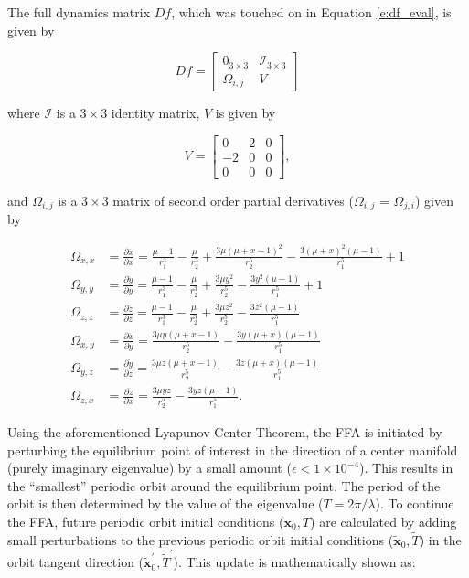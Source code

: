 \documentclass[11pt]{article} %
\begin{document}
\noindent
The full dynamics matrix $Df$, which was touched on in Equation \ref{e:df_eval}, is given by

\doublespace
\begin{equation}
	\label{e:df_full}
	Df = \begin{bmatrix}
		0_{3\times3} & \mathcal{I}_{3\times3} \\
		\Omega_{i,j} & V
	\end{bmatrix}
\end{equation}
\singlespace

\noindent
where $\mathcal{I}$ is a $3\times3$ identity matrix, $V$ is given by

\begin{equation}
	V = \begin{bmatrix}
		0 & 2 & 0 \\
		-2 & 0 & 0 \\
		0 & 0 & 0
	\end{bmatrix},
\end{equation}

\noindent
and $\Omega_{i,j}$ is a $3\times3$ matrix of second order partial derivatives ($\Omega_{i,j}$ = $\Omega_{j,i}$) given by

\begin{align}
	\Omega_{x,x} &= \frac{\partial\ddot{x}}{\partial x} = \frac{\mu - 1}{r_1^3} - \frac{\mu}{r_2^3} + \frac{3\mu\left(\mu+x-1\right)^2}{r_2^5} - \frac{3\left(\mu+x\right)^2\left(\mu-1\right)}{r_1^5} + 1 \\
	\Omega_{y,y} &= \frac{\partial\ddot{y}}{\partial y} = \frac{\mu - 1}{r_1^3} - \frac{\mu}{r_2^3} + \frac{3\mu y^2}{r_2^5} - \frac{3y^2\left(\mu-1\right)}{r_1^5} + 1 \\
	\Omega_{z,z} &= \frac{\partial\ddot{z}}{\partial z} = \frac{\mu - 1}{r_1^3} - \frac{\mu}{r_2^3} + \frac{3\mu z^2}{r_2^5} - \frac{3z^2\left(\mu-1\right)}{r_1^5} \\
	\Omega_{x,y} &= \frac{\partial\ddot{x}}{\partial y} = \frac{3\mu y\left(\mu+x-1\right)}{r_2^5} - \frac{3y\left(\mu+x\right)\left(\mu-1\right)}{r_1^5} \\
	\Omega_{y,z} &= \frac{\partial\ddot{y}}{\partial z} = \frac{3\mu z\left(\mu+x-1\right)}{r_2^5} - \frac{3z\left(\mu+x\right)\left(\mu-1\right)}{r_1^5}\\
	\Omega_{z,x} &= \frac{\partial\ddot{z}}{\partial x} = \frac{3\mu yz}{r_2^5} - \frac{3yz\left(\mu-1\right)}{r_1^5}.
\end{align}

\noindent
Using the aforementioned Lyapunov Center Theorem, the FFA is initiated by perturbing the equilibrium point of interest in the direction of a center manifold (purely imaginary eigenvalue) by a small amount ($\epsilon < 1\times10^{-4}$). This results in the ``smallest'' periodic orbit around the equilibrium point. The period of the orbit is then determined by the value of the eigenvalue ($T=2\pi/\lambda$). To continue the FFA, future periodic orbit initial conditions ($\bm{x}_0, T$) are calculated by adding small perturbations to the previous periodic orbit initial conditions ($\tilde{\bm{x}}_0, \tilde{T}$) in the orbit tangent direction ($\tilde{\bm{x}}_0^{\prime}, \tilde{T}^{\prime}$). This update is mathematically shown as:
\end{document}
